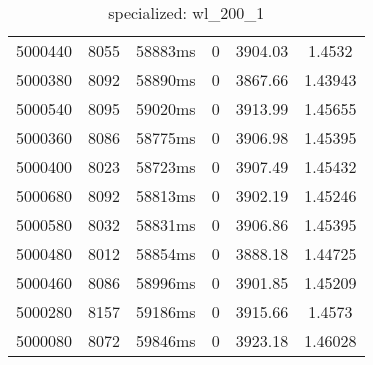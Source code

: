 \documentclass[./main.tex]{subfiles}
\begin{document}
\begin{table}
\begin{tabular}{ c | c | c | c | c | c }
        \hline
        5000440 & 8055 & 58883ms & 0 & 3904.03 & 1.4532 \\
        5000380 & 8092 & 58890ms & 0 & 3867.66 & 1.43943 \\
        5000540 & 8095 & 59020ms & 0 & 3913.99 & 1.45655 \\
        5000360 & 8086 & 58775ms & 0 & 3906.98 & 1.45395 \\
        5000400 & 8023 & 58723ms & 0 & 3907.49 & 1.45432 \\
        5000680 & 8092 & 58813ms & 0 & 3902.19 & 1.45246 \\
        \rowcolor{lightgray} 5000580 & 8032 & 58831ms & 0 & 3906.86 & 1.45395 \\
        5000480 & 8012 & 58854ms & 0 & 3888.18 & 1.44725 \\
        5000460 & 8086 & 58996ms & 0 & 3901.85 & 1.45209 \\
        5000280 & 8157 & 59186ms & 0 & 3915.66 & 1.4573 \\
        5000080 & 8072 & 59846ms & 0 & 3923.18 & 1.46028 \\
    \end{tabular}
    \caption{specialized: wl\_200\_1}
\end{table}
\end{document}
